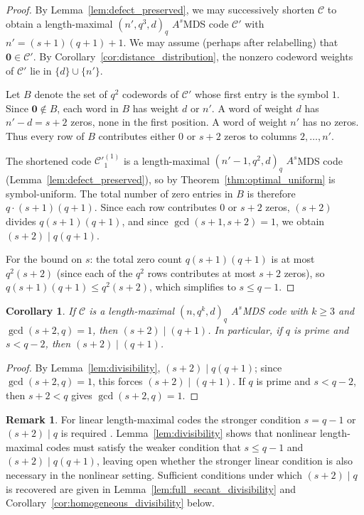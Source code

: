 \documentclass[12pt, letterpaper]{article}
\theoremstyle{plain}
\newtheorem{corollary}[theorem]{Corollary}
\theoremstyle{definition}
\newtheorem{remark}[theorem]{Remark}
\begin{document}
	\begin{proof}
		By Lemma~\ref{lem:defect_preserved}, we may successively shorten $\mathcal{C}$ to obtain a length-maximal $(n', q^3, d)_q$ $A^s$MDS code $\mathcal{C}'$ with $n' = (s+1)(q+1)+1$. We may assume (perhaps after relabelling) that $\mathbf{0} \in \mathcal{C}'$. By Corollary~\ref{cor:distance_distribution}, the nonzero codeword weights of $\mathcal{C}'$ lie in $\{d\} \cup \{n'\}$.
		
		Let $B$ denote the set of $q^2$ codewords of $\mathcal{C}'$ whose first entry is the symbol $1$. Since $\mathbf{0} \notin B$, each word in $B$ has weight $d$ or $n'$. A word of weight $d$ has
		$n' - d = s+2$ zeros, none in the first position. A word of weight $n'$ has no zeros. Thus every row of $B$ contributes either $0$ or $s+2$ zeros to columns	$2, \ldots, n'$.
		
		 The shortened code $\mathcal{C'}_1^{(1)}$ is a length-maximal $(n'-1, q^2, d)_q$ $A^s$MDS code  (Lemma~\ref{lem:defect_preserved}), so by Theorem~\ref{thm:optimal_uniform} is 	symbol-uniform. The total number of zero entries in $B$ is therefore $q \cdot (s+1)(q+1)$. Since each row contributes $0$ or $s+2$ zeros, $(s+2)$ divides $q(s+1)(q+1)$, and since	$\gcd(s+1, s+2) = 1$, we obtain $(s+2) \mid q(q+1)$.
		
		For the bound on $s$: the total zero count $q(s+1)(q+1)$ is at most  $q^2(s+2)$ (since each of the $q^2$ rows contributes at most $s+2$ zeros), so $q(s+1)(q+1) \le q^2(s+2)$, which simplifies to $s \le q-1$. 
			\end{proof}
		
	\begin{corollary}\label{cor:divisibility_gcd}
		If $\mathcal{C}$ is a length-maximal $(n, q^k, d)_q$ $A^s$MDS code 	with $k \ge 3$ and $\gcd(s+2, q) = 1$, then $(s+2) \mid (q+1)$. In particular, if $q$ is prime and $s < q-2$, then $(s+2) \mid (q+1)$.
	\end{corollary}
	
	\begin{proof}
		By Lemma~\ref{lem:divisibility}, $(s+2) \mid q(q+1)$; since $\gcd(s+2, q) = 1$, this forces $(s+2) \mid (q+1)$. If $q$ is prime and $s < q-2$, then $s+2 < q$ gives $\gcd(s+2, q) = 1$.
	\end{proof}
	
	\begin{remark}
		For linear length-maximal codes the stronger condition $s=q-1$ or $(s+2) \mid q$ is required \cite{Ball1997MaximalArcs, alderson2025projectivesystems}. 	Lemma~\ref{lem:divisibility} shows that nonlinear length-maximal codes must satisfy the weaker condition that $s\le q-1$ and $(s+2) \mid q(q+1)$, leaving open whether the stronger linear condition is also necessary in the nonlinear
		setting. Sufficient conditions under which $(s+2)\mid q$ is recovered are given in Lemma~\ref{lem:full_secant_divisibility} and Corollary~\ref{cor:homogeneous_divisibility} below.
	\end{remark}
\end{document}
